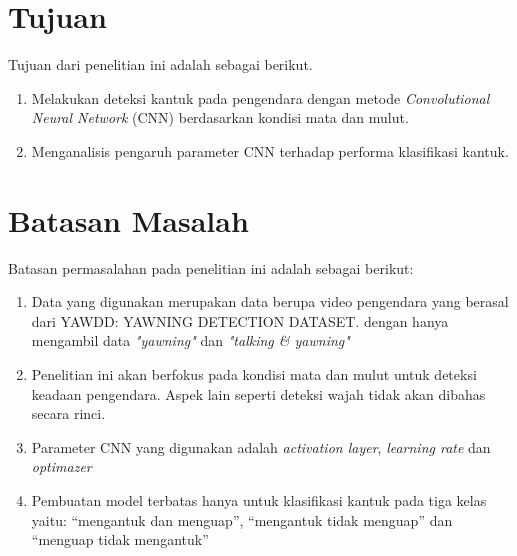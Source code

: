 \section{Tujuan}
Tujuan dari penelitian ini adalah sebagai berikut.

\begin{enumerate}

    \item Melakukan deteksi kantuk pada pengendara dengan metode \textit{Convolutional Neural Network} (CNN) berdasarkan kondisi mata dan mulut.
    
    \item Menganalisis pengaruh parameter CNN terhadap performa klasifikasi kantuk.

\end{enumerate}
\section{Batasan Masalah}
Batasan permasalahan pada penelitian ini adalah sebagai berikut:
\begin{enumerate}

    \item Data yang digunakan merupakan data berupa video pengendara 
    yang berasal dari YAWDD: YAWNING DETECTION DATASET. dengan hanya
    mengambil data \textit{"yawning"} dan \textit{"talking \& yawning"}
    \item Penelitian ini akan berfokus pada kondisi mata dan mulut untuk deteksi keadaan pengendara. Aspek lain seperti deteksi wajah tidak akan dibahas secara rinci. 
    \item Parameter CNN yang digunakan adalah \textit{activation layer}, \textit{learning rate} dan \textit{optimazer}
    \item Pembuatan model terbatas hanya untuk klasifikasi kantuk pada tiga kelas yaitu: “mengantuk dan menguap”, “mengantuk tidak menguap” dan “menguap tidak mengantuk”

    

\end{enumerate}